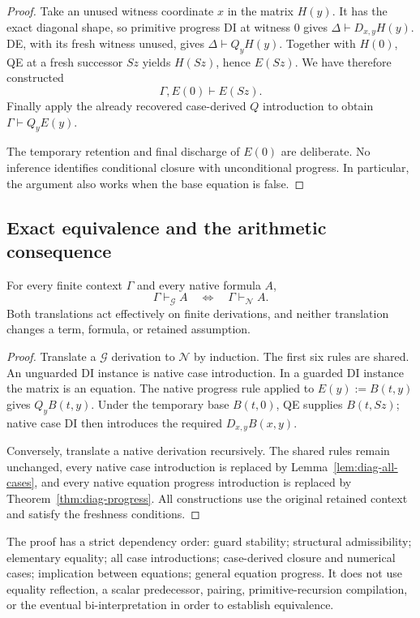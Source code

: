 \begin{proof}
Take an unused witness coordinate $x$ in the matrix $H(y)$.
It has the exact diagonal shape, so primitive progress DI at witness
$0$ gives $\Delta\vdash D_{x,y}H(y)$.
DE, with its fresh witness unused, gives $\Delta\vdash Q_yH(y)$.
Together with $H(0)$, QE at a fresh successor $Sz$ yields $H(Sz)$,
hence $E(Sz)$.  We have therefore constructed
\[
 \Gamma,E(0)\vdash E(Sz).
\]
Finally apply the already recovered case-derived $Q$ introduction to
obtain $\Gamma\vdash Q_yE(y)$.

The temporary retention and final discharge of $E(0)$ are deliberate.
No inference identifies conditional closure with unconditional progress.
In particular, the argument also works when the base equation is false.
\end{proof}

\subsection{Exact equivalence and the arithmetic consequence}

\begin{theorem}
\label{thm:diag-equivalence}
For every finite context $\Gamma$ and every native formula $A$,
\[
 \boxed{\quad
 \Gamma\vdash_{\mathcal G}A
 \quad\Longleftrightarrow\quad
 \Gamma\vdash_{\mathcal N}A.
 \quad}
\]
Both translations act effectively on finite derivations, and neither
translation changes a term, formula, or retained assumption.
\end{theorem}
\begin{proof}
Translate a $\mathcal G$ derivation to $\mathcal N$ by induction.
The first six rules are shared.  An unguarded DI instance is native
case introduction.  In a guarded DI instance the matrix is an equation.
The native progress rule applied to $E(y):=B(t,y)$ gives $Q_yB(t,y)$.
Under the temporary base $B(t,0)$, QE supplies $B(t,Sz)$; native case
DI then introduces the required $D_{x,y}B(x,y)$.

Conversely, translate a native derivation recursively.
The shared rules remain unchanged, every native case introduction is
replaced by Lemma~\ref{lem:diag-all-cases}, and every native equation
progress introduction is replaced by
Theorem~\ref{thm:diag-progress}.  All constructions use the original
retained context and satisfy the freshness conditions.
\end{proof}

The proof has a strict dependency order:
guard stability; structural admissibility; elementary equality;
all case introductions; case-derived closure and numerical cases;
implication between equations; general equation progress.
It does not use equality reflection, a scalar predecessor, pairing,
primitive-recursion compilation, or the eventual bi-interpretation in
order to establish equivalence.

